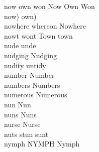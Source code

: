 now own won Now Own Won\\
now) own)\\
nowhere whereon Nowhere\\
nowt wont Town town\\
nude unde\\
nudging Nudging\\
nudity untidy\\
number Number\\
numbers Numbers\\
numerous Numerous\\
nun Nun\\
nuns Nuns\\
nurse Nurse\\
nuts stun sunt\\
nymph NYMPH Nymph\\

